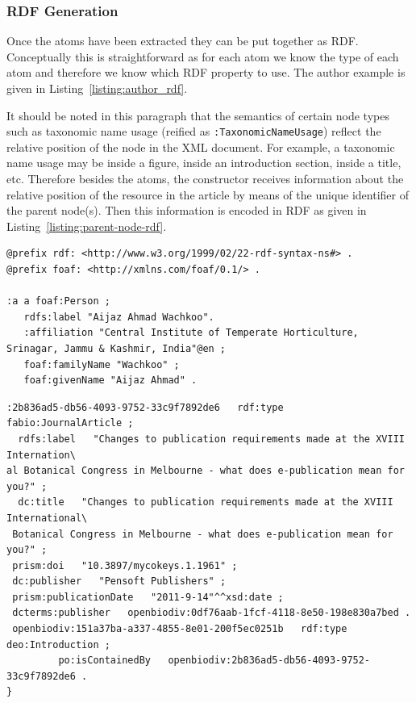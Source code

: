 \subsubsection{RDF Generation}

Once the atoms have been extracted they can be put together as RDF. Conceptually this is straightforward as for each atom we know the type of each atom and therefore we know which RDF property to use. The author example is given in Listing~\ref{listing:author_rdf}.

It should be noted in this paragraph that the semantics of certain node types such as taxonomic name usage (reified as {\tt :TaxonomicNameUsage}) reflect the relative position of the node in the XML document. For example, a taxonomic name usage may be inside a figure, inside an introduction section, inside a title, etc. Therefore besides the atoms, the constructor receives information about the relative position of the resource in the article by means of the unique identifier of the parent node(s). Then this information is encoded in RDF as given in Listing~\ref{listing:parent-node-rdf}. 

\begin{lstlisting}[language=SPARQL,
caption=RDF snippet of an author. This is a somewhat idealized situation in which the language of the address was available from the article., label=listing:author_rdf, basicstyle=\ttfamily\tiny]
@prefix rdf: <http://www.w3.org/1999/02/22-rdf-syntax-ns#> .
@prefix foaf: <http://xmlns.com/foaf/0.1/> .

:a a foaf:Person ;
   rdfs:label "Aijaz Ahmad Wachkoo".
   :affiliation "Central Institute of Temperate Horticulture, Srinagar, Jammu & Kashmir, India"@en ;
   foaf:familyName "Wachkoo" ;
   foaf:givenName "Aijaz Ahmad" .
\end{lstlisting}

\begin{lstlisting}[language=SPARQL,
caption=., label=listing:parent-node-rdf, basicstyle=\ttfamily\tiny]
:2b836ad5-db56-4093-9752-33c9f7892de6   rdf:type   fabio:JournalArticle ;
  rdfs:label   "Changes to publication requirements made at the XVIII Internation\
al Botanical Congress in Melbourne - what does e-publication mean for you?" ;
  dc:title   "Changes to publication requirements made at the XVIII International\
 Botanical Congress in Melbourne - what does e-publication mean for you?" ;
 prism:doi   "10.3897/mycokeys.1.1961" ;
 dc:publisher   "Pensoft Publishers" ;
 prism:publicationDate   "2011-9-14"^^xsd:date ;
 dcterms:publisher   openbiodiv:0df76aab-1fcf-4118-8e50-198e830a7bed .
 openbiodiv:151a37ba-a337-4855-8e01-200f5ec0251b   rdf:type   deo:Introduction ;
         po:isContainedBy   openbiodiv:2b836ad5-db56-4093-9752-33c9f7892de6 .
}
\end{lstlisting}

